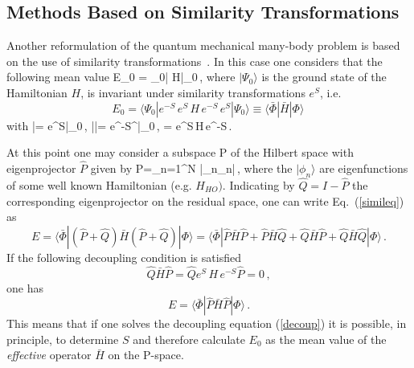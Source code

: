 \subsection{Methods Based on Similarity Transformations~\label{sec:SIM}}
Another reformulation of the quantum mechanical many-body problem is based on the use of similarity
transformations~\cite{Ok54,CoK60,DaS64,SuL80}.
In this case one considers that the following mean value
\be
E_0 = \langle\Psi_0| H|\Psi_0\rangle \,,
\ee
where $|\Psi_0\rangle$ is the ground state  of the Hamiltonian $H$, 
is invariant under similarity transformations $e^S$, i.e.
\begin{equation} 
E_0= \langle\Psi_0|e^{-S} \,e^{S}\, H\,e^{-S} \, e^{S}|\Psi_0\rangle
\equiv \langle \bar\Phi|{\bar H} |\Phi\rangle\label{simileq} \, 
\end{equation}
with  
\be
|\Phi\rangle = e^{S}|\Psi_0\rangle \,, \qquad |\bar\Phi\rangle = e^{-S^\dagger}|\Psi_0\rangle \,,
  = e^{S}\,H\,e^{-S}\,.
\ee 

At this point one may consider a subspace P of the  Hilbert space  with  eigenprojector $\hat P$ given by 
\be
\hat P=\sum_{n=1}^N |\phi_n\rangle\langle\phi_n|\,, 
\ee 
where the $|\phi_n\rangle$ are eigenfunctions of some well known Hamiltonian (e.g. $H_{HO})$.
Indicating by $\hat Q=I-\hat P$ the corresponding eigenprojector on the  residual space, one can write Eq.~(\ref{simileq})
as 
\begin{equation}
E=\langle \bar\Phi|(\hat P + \hat Q){\bar H}(\hat P + \hat Q) |\Phi\rangle =
\langle \bar\Phi|\hat P{\bar H}\hat P+\hat P{\bar H}\hat Q+\hat Q{\bar H}\hat P+\hat Q{\bar H}\hat Q|\Phi\rangle\,.
\end{equation}
If  the following decoupling condition is satisfied
\begin{equation}
 \hat Q{\bar H}\hat P = \hat Q e^{S}\, H\,e^{-S}\hat P = 0\,,
\label{decoup}
\end{equation}
one has
\begin{equation}
E=\langle \bar\Phi|\hat P{\bar H}\hat P|\Phi\rangle\,.
\end{equation} 
This means that if one solves the decoupling equation (\ref{decoup}) it is possible, in principle, to determine $S$ and therefore
calculate $E_0$ as the mean value of the {\it effective} operator ${\bar H}$ on the P-space.  

